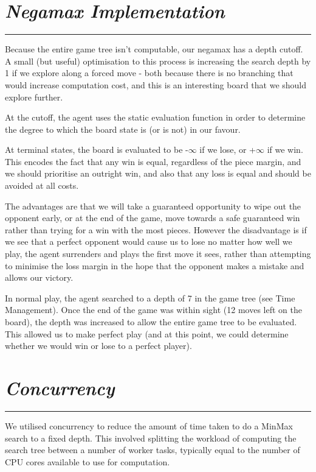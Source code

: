 \documentclass[10pt]{report}
\begin{document}
\begin{multicols}{2}
\section*{\emph{\textmd{Negamax Implementation}}}
\hrule

Because the entire game tree isn't computable, our negamax has a depth cutoff. A small (but useful) optimisation to this process is increasing the search depth by 1 if we explore along a forced move - both because there is no branching that would increase computation cost, and this is an interesting board that we should explore further.

At the cutoff, the agent uses the static evaluation function in order to determine the degree to which the board state is (or is not) in our favour.

At terminal states, the board is evaluated to be -$\infty$ if we lose, or +$\infty$ if we win. This encodes the fact that any win is equal, regardless of the piece margin, and we should prioritise an outright win, and also that any loss is equal and should be avoided at all costs.

The advantages are that we will take a guaranteed opportunity to wipe out the opponent early, or at the end of the game, move towards a safe guaranteed win rather than trying for a win with the most pieces. However the disadvantage is if we see that a perfect opponent would cause us to lose no matter how well we play, the agent surrenders and plays the first move it sees, rather than attempting to minimise the loss margin in the hope that the opponent makes a mistake and allows our victory.

In normal play, the agent searched to a depth of 7 in the game tree (see Time Management). Once the end of the game was within sight (12 moves left on the board), the depth was increased to allow the entire game tree to be evaluated. This allowed us to make perfect play (and at this point, we could determine whether we would win or lose to a perfect player).
\section*{\emph{Concurrency}}
\hrule

We utilised concurrency to reduce the amount of time taken to do a MinMax search to a fixed depth. This involved splitting the workload of computing the search tree between a number of worker tasks, typically equal to the number of CPU cores available to use for computation.


\end{multicols}
\end{document}
